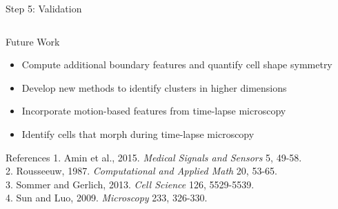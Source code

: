 \documentclass[final,hyperref={pdfpagelabels=false}]{beamer}
\begin{document}
\begin{frame}[t]
\begin{columns}[t]
\begin{column}{.31\textwidth}
\begin{block}{Step 5: Validation}
\begin{columns}
\end{columns}

\end{block}


\begin{block}{Future Work}
\begin{itemize}
\item Compute additional boundary features and quantify cell shape symmetry 
\item Develop new methods to identify clusters in higher dimensions 
\item Incorporate motion-based features from time-lapse microscopy
\item Identify cells that morph during time-lapse microscopy
\end{itemize}
\end{block}


\begin{block}{References}
1. Amin et al., 2015. \textit{Medical Signals and Sensors} 5, 49-58.\\
2. Rousseeuw, 1987. \textit{Computational and Applied Math} 20, 53-65.\\
3. Sommer and Gerlich, 2013. \textit{Cell Science} 126, 5529-5539.\\
4. Sun and Luo, 2009. \textit{Microscopy} 233, 326-330.
\end{block}


\end{column} 

\begin{column}{.01\textwidth}\end{column} 

\end{columns} 

\end{frame}
\end{document}
